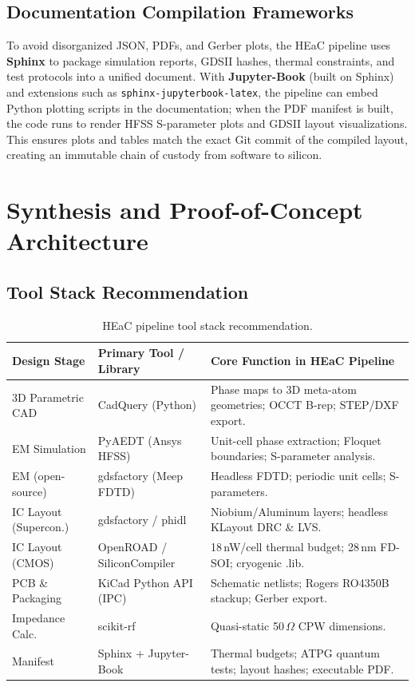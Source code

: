 \documentclass[11pt, a4paper]{article}
\begin{document}
\subsection{Documentation Compilation Frameworks}

To avoid disorganized JSON, PDFs, and Gerber plots, the HEaC pipeline uses \textbf{Sphinx} to package simulation reports, GDSII hashes, thermal constraints, and test protocols into a unified document. With \textbf{Jupyter-Book} (built on Sphinx) and extensions such as \texttt{sphinx-jupyterbook-latex}, the pipeline can embed Python plotting scripts in the documentation; when the PDF manifest is built, the code runs to render HFSS S-parameter plots and GDSII layout visualizations. This ensures plots and tables match the exact Git commit of the compiled layout, creating an immutable chain of custody from software to silicon.

\section{Synthesis and Proof-of-Concept Architecture}

\subsection{Tool Stack Recommendation}

\begin{table}[htbp]
\centering
\caption{HEaC pipeline tool stack recommendation.}
\label{tab:toolstack}
\begin{tabular}{@{}lll@{}}
\toprule
Design Stage & Primary Tool / Library & Core Function in HEaC Pipeline \\
\midrule
3D Parametric CAD & CadQuery (Python) & Phase maps to 3D meta-atom geometries; OCCT B-rep; STEP/DXF export. \\
EM Simulation & PyAEDT (Ansys HFSS) & Unit-cell phase extraction; Floquet boundaries; S-parameter analysis. \\
EM (open-source) & gdsfactory (Meep FDTD) & Headless FDTD; periodic unit cells; S-parameters. \\
IC Layout (Supercon.) & gdsfactory / phidl & Niobium/Aluminum layers; headless KLayout DRC \& LVS. \\
IC Layout (CMOS) & OpenROAD / SiliconCompiler & 18\,nW/cell thermal budget; 28\,nm FD-SOI; cryogenic .lib. \\
PCB \& Packaging & KiCad Python API (IPC) & Schematic netlists; Rogers RO4350B stackup; Gerber export. \\
Impedance Calc. & scikit-rf & Quasi-static 50\,$\Omega$ CPW dimensions. \\
Manifest & Sphinx + Jupyter-Book & Thermal budgets; ATPG quantum tests; layout hashes; executable PDF. \\
\bottomrule
\end{tabular}
\end{table}
\end{document}
